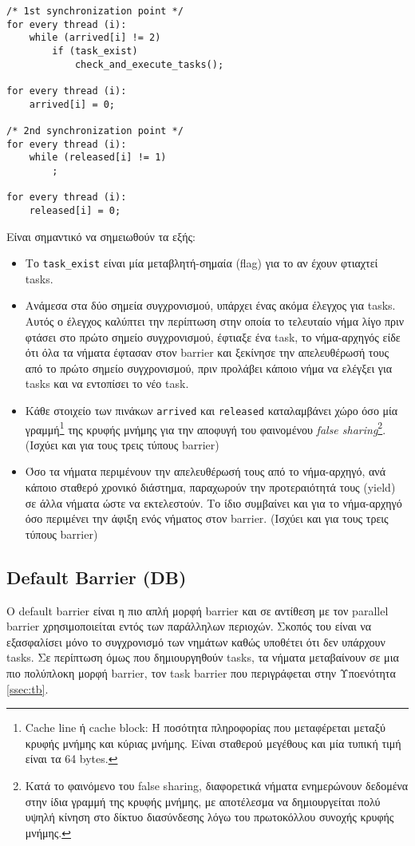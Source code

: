 \begin{lstlisting}[label=prg:pb2, caption=Parallel barrier για το νήμα-αρχηγό.]
/* 1st synchronization point */
for every thread (i):
    while (arrived[i] != 2)
        if (task_exist)
            check_and_execute_tasks();
        
for every thread (i):
    arrived[i] = 0;
   
/* 2nd synchronization point */
for every thread (i):
    while (released[i] != 1)
        ;
        
for every thread (i):
    released[i] = 0;
\end{lstlisting}


\noindent Είναι σημαντικό να σημειωθούν τα εξής:
\begin{itemize}
	\item Το \texttt{task\_exist} είναι μία μεταβλητή-σημαία (flag) για το αν έχουν φτιαχτεί tasks.
	\item Aνάμεσα στα δύο σημεία συγχρονισμού, υπάρχει ένας ακόμα έλεγχος για tasks. Αυτός ο έλεγχος καλύπτει την περίπτωση στην οποία το τελευταίο νήμα λίγο πριν φτάσει στο πρώτο σημείο συγχρονισμού, έφτιαξε ένα task, το νήμα-αρχηγός είδε ότι όλα τα νήματα έφτασαν στον barrier και ξεκίνησε την απελευθέρωσή τους από το πρώτο σημείο συγχρονισμού, πριν προλάβει κάποιο νήμα να ελέγξει για tasks και να εντοπίσει το νέο task.
	\item Κάθε στοιχείο των πινάκων \texttt{arrived} και \texttt{released} καταλαμβάνει χώρο όσο μία γραμμή\footnote{Cache line ή cache block: Η ποσότητα πληροφορίας που μεταφέρεται μεταξύ κρυφής μνήμης και κύριας μνήμης. Είναι σταθερού μεγέθους και μία τυπική τιμή είναι τα 64 bytes.} της κρυφής μνήμης για την αποφυγή του φαινομένου \textit{false sharing}\footnote{Κατά το φαινόμενο του false sharing, διαφορετικά νήματα ενημερώνουν δεδομένα στην ίδια γραμμή της κρυφής μνήμης, με αποτέλεσμα να δημιουργείται πολύ υψηλή κίνηση στο δίκτυο διασύνδεσης λόγω του πρωτοκόλλου συνοχής κρυφής μνήμης.}. (Ισχύει και για τους τρεις τύπους barrier)
	\item Όσο τα νήματα περιμένουν την απελευθέρωσή τους από το νήμα-αρχηγό, ανά κάποιο σταθερό χρονικό διάστημα, παραχωρούν την προτεραιότητά τους (yield) σε άλλα νήματα ώστε να εκτελεστούν. Το ίδιο συμβαίνει και για το νήμα-αρχηγό όσο περιμένει την άφιξη ενός νήματος στον barrier. (Ισχύει και για τους τρεις τύπους barrier)
\end{itemize}


\subsection{Default Barrier (DB)}
Ο default barrier είναι η πιο απλή μορφή barrier και σε αντίθεση με τον parallel barrier χρησιμοποιείται εντός των παράλληλων περιοχών. Σκοπός του είναι να εξασφαλίσει μόνο το συγχρονισμό των νημάτων καθώς υποθέτει ότι δεν υπάρχουν tasks. Σε περίπτωση όμως που δημιουργηθούν tasks, τα νήματα μεταβαίνουν σε μια πιο πολύπλοκη μορφή barrier, τον task barrier που περιγράφεται στην Υποενότητα \ref{ssec:tb}. 

